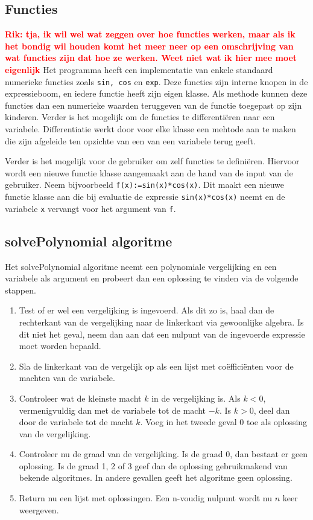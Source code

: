 \documentclass[a4paper]{article}
\newcommand{\rcom}[1]{\textbf{\textcolor{red}{#1}}}
\newcommand{\ttt}[1]{\texttt{#1}}
\begin{document}
\subsection{Functies}\rcom{Rik: tja, ik wil wel wat zeggen over hoe functies werken, maar als ik het bondig wil houden komt het meer  neer op een omschrijving van wat functies zijn dat hoe ze werken. Weet niet wat ik hier mee moet eigenlijk}
Het programma heeft een implementatie van enkele standaard numerieke functies zoals \ttt{sin, cos} en \ttt{exp}. Deze functies zijn interne knopen in de expressieboom, en iedere functie heeft zijn eigen klasse. Als methode kunnen deze functies dan een numerieke waarden teruggeven van de functie toegepast op zijn kinderen. Verder is het mogelijk om de functies te differenti\"eren naar een variabele. Differentiatie werkt door voor elke klasse een mehtode aan te maken die zijn afgeleide ten opzichte van een van een variabele terug geeft.

 Verder is het mogelijk voor de gebruiker om zelf functies te defini\"eren. Hiervoor wordt een nieuwe functie klasse aangemaakt aan de hand van de input van de gebruiker. Neem bijvoorbeeld \ttt{f(x):=sin(x)*cos(x)}. Dit maakt een nieuwe functie klasse aan die bij evaluatie de expressie \ttt{sin(x)*cos(x)} neemt en de variabele \ttt{x} vervangt voor het argument van \ttt{f}. 


\subsection{solvePolynomial algoritme}
Het solvePolynomial algoritme neemt een polynomiale vergelijking en een variabele als argument en probeert dan een oplossing te vinden via de volgende stappen.
\begin{enumerate}
\item Test of er wel een vergelijking is ingevoerd. Als dit zo is, haal dan de rechterkant van de vergelijking naar de linkerkant via gewoonlijke algebra. Is dit niet het geval, neem dan aan dat een nulpunt van de ingevoerde expressie moet worden bepaald.
\item Sla de linkerkant van de vergelijk op als een lijst met co\"effici\"enten voor de machten van de variabele. 
\item Controleer wat de kleinste macht $k$ in de vergelijking is. Als $k<0$, vermenigvuldig dan met de variabele tot de macht $-k$. Is $k>0$, deel dan door de variabele tot de macht $k$. Voeg in het tweede geval 0 toe als oplossing van de vergelijking.
\item Controleer nu de graad van de vergelijking. Is de graad 0, dan bestaat er geen oplossing. Is de graad 1, 2 of 3 geef dan de oplossing gebruikmakend van bekende algoritmes. In andere gevallen geeft het algoritme geen oplossing.
\item Return nu een lijst met oplossingen. Een n-voudig nulpunt wordt nu $n$ keer weergeven.
\end{enumerate}
\end{document}
